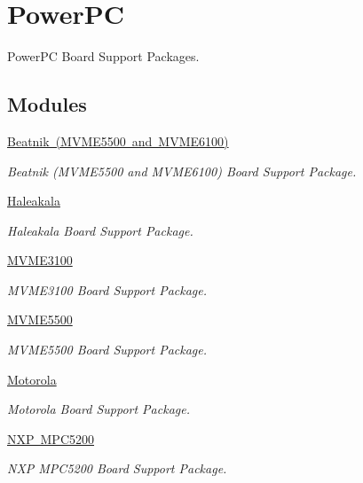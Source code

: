 \hypertarget{group__RTEMSBSPsPowerPC}{}\section{Power\+PC}
\label{group__RTEMSBSPsPowerPC}


Power\+PC Board Support Packages.  


\subsection*{Modules}
\begin{DoxyCompactItemize}
\item 
\mbox{\hyperlink{group__RTEMSBSPsPowerPCBeatnik}{Beatnik (\+M\+V\+M\+E5500 and M\+V\+M\+E6100)}}
\begin{DoxyCompactList}\small\item\em Beatnik (M\+V\+M\+E5500 and M\+V\+M\+E6100) Board Support Package. \end{DoxyCompactList}\item 
\mbox{\hyperlink{group__RTEMSBSPsPowerPCHaleakala}{Haleakala}}
\begin{DoxyCompactList}\small\item\em Haleakala Board Support Package. \end{DoxyCompactList}\item 
\mbox{\hyperlink{group__RTEMSBSPsPowerPCMVME3100}{M\+V\+M\+E3100}}
\begin{DoxyCompactList}\small\item\em M\+V\+M\+E3100 Board Support Package. \end{DoxyCompactList}\item 
\mbox{\hyperlink{group__RTEMSBSPsPowerPCMVME5500}{M\+V\+M\+E5500}}
\begin{DoxyCompactList}\small\item\em M\+V\+M\+E5500 Board Support Package. \end{DoxyCompactList}\item 
\mbox{\hyperlink{group__RTEMSBSPsPowerPCMotorola}{Motorola}}
\begin{DoxyCompactList}\small\item\em Motorola Board Support Package. \end{DoxyCompactList}\item 
\mbox{\hyperlink{group__RTEMSBSPsPowerPCGen5200}{N\+X\+P M\+P\+C5200}}
\begin{DoxyCompactList}\small\item\em N\+XP M\+P\+C5200 Board Support Package. \end{DoxyCompactList}\item 

\end{DoxyCompactItemize}
